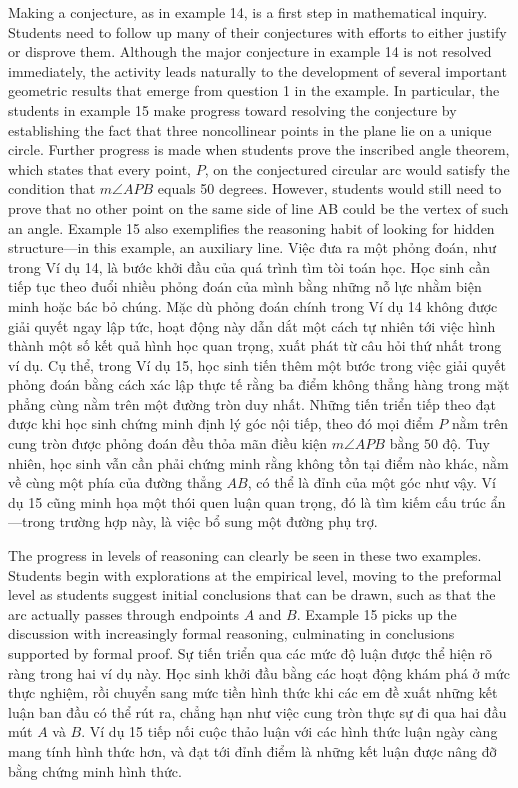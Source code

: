 \documentclass[
  10pt,
  a4paper,
  landscape,
  twoside,
  openany
]{scrbook}
\newcommand{\EN}[1]{#1}
\newcommand{\VI}[1]{#1}
\newcommand{\NOTE}[1]{#1}
\newcounter{example}
\begin{document}
\TriPara
{
\EN{Making a conjecture, as in example 14, is a first step in mathematical inquiry. Students need to follow up many of their conjectures with efforts to either justify or disprove them. Although the major conjecture in example 14 is not resolved immediately, the activity leads naturally to the development of several important geometric results that emerge from question 1 in the example. In particular, the students in example 15 make progress toward resolving the conjecture by establishing the fact that three noncollinear points in the plane lie on a unique circle. Further progress is made when students prove the inscribed angle theorem, which states that every point, $P$, on the conjectured circular arc would satisfy the condition that $m\angle APB$ equals 50 degrees. However, students would still need to prove that no other point on the same side of line AB could be the vertex of such an angle. Example 15 also exemplifies the reasoning habit of looking for hidden structure---in this example, an auxiliary line.}
}
{
\VI{Việc đưa ra một phỏng đoán, như trong Ví dụ 14, là bước khởi đầu của quá trình tìm tòi toán học. Học sinh cần tiếp tục theo đuổi nhiều phỏng đoán của mình bằng những nỗ lực nhằm biện minh hoặc bác bỏ chúng. Mặc dù phỏng đoán chính trong Ví dụ 14 không được giải quyết ngay lập tức, hoạt động này dẫn dắt một cách tự nhiên tới việc hình thành một số kết quả hình học quan trọng, xuất phát từ câu hỏi thứ nhất trong ví dụ. Cụ thể, trong Ví dụ 15, học sinh tiến thêm một bước trong việc giải quyết phỏng đoán bằng cách xác lập thực tế rằng ba điểm không thẳng hàng trong mặt phẳng cùng nằm trên một đường tròn duy nhất. Những tiến triển tiếp theo đạt được khi học sinh chứng minh định lý góc nội tiếp, theo đó mọi điểm $P$ nằm trên cung tròn được phỏng đoán đều thỏa mãn điều kiện $m\angle APB$ bằng $50$ độ. Tuy nhiên, học sinh vẫn cần phải chứng minh rằng không tồn tại điểm nào khác, nằm về cùng một phía của đường thẳng $AB$, có thể là đỉnh của một góc như vậy. Ví dụ 15 cũng minh họa một thói quen luận quan trọng, đó là tìm kiếm cấu trúc ẩn---trong trường hợp này, là việc bổ sung một đường phụ trợ.}
}
{
\NOTE{}
}

\TriPara
{
\EN{The progress in levels of reasoning can clearly be seen in these two examples. Students begin with explorations at the empirical level, moving to the preformal level as students suggest initial conclusions that can be drawn, such as that the arc actually passes through endpoints $A$ and $B$. Example 15 picks up the discussion with increasingly formal reasoning, culminating in conclusions supported by formal proof.}
}
{
\VI{Sự tiến triển qua các mức độ luận được thể hiện rõ ràng trong hai ví dụ này. Học sinh khởi đầu bằng các hoạt động khám phá ở mức thực nghiệm, rồi chuyển sang mức tiền hình thức khi các em đề xuất những kết luận ban đầu có thể rút ra, chẳng hạn như việc cung tròn thực sự đi qua hai đầu mút $A$ và $B$. Ví dụ 15 tiếp nối cuộc thảo luận với các hình thức luận ngày càng mang tính hình thức hơn, và đạt tới đỉnh điểm là những kết luận được nâng đỡ bằng chứng minh hình thức.}
}
{
\NOTE{}
}
\end{document}
